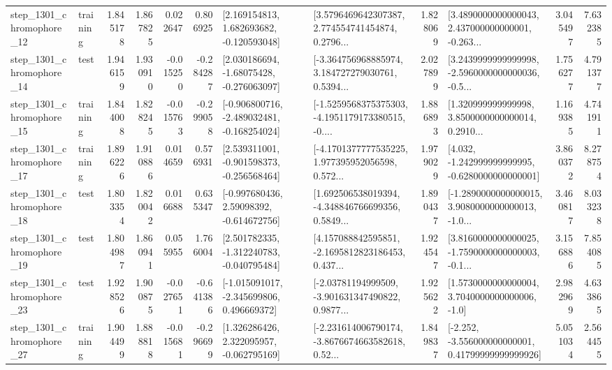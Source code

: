 \begin{tabular}{llrrrrllrlrr}
 step\_1301\_chromophore\_12 &  training &      1.845178 &    1.867825 &      0.022647 &  0.806925 &    [2.169154813, 1.682693682, -0.120593048] &  [3.5796469642307387, 2.774554741454874, 0.2796... &       1.828069 &  [3.4890000000000043, 2.437000000000001, -0.263... &            3.045497 &          7.632385 \\
 step\_1301\_chromophore\_14 &      test &      1.946159 &    1.930910 &     -0.015250 & -0.284287 &    [2.030186694, -1.68075428, -0.276063097] &  [-3.364756968885974, 3.184727279030761, 0.5394... &       2.027899 &  [3.2439999999999998, -2.5960000000000036, -0.5... &            1.756277 &          4.791377 \\
 step\_1301\_chromophore\_15 &  training &      1.844008 &    1.828245 &     -0.015763 & -0.299058 &  [-0.906800716, -2.489032481, -0.168254024] &  [-1.5259568375375303, -4.1951179173380515, -0.... &       1.886893 &  [1.320999999999998, 3.8500000000000014, 0.2910... &            1.169385 &          4.741911 \\
 step\_1301\_chromophore\_17 &  training &      1.896226 &    1.910886 &      0.014659 &  0.576931 &   [2.539311001, -0.901598373, -0.256568464] &  [-4.1701377777535225, 1.977395952056598, 0.572... &       1.979029 &   [4.032, -1.242999999999995, -0.6280000000000001] &            3.860372 &          8.278754 \\
 step\_1301\_chromophore\_18 &      test &      1.803354 &    1.820042 &      0.016688 &  0.635347 &    [-0.997680436, 2.59098392, -0.614672756] &  [1.692506538019394, -4.348846766699356, 0.5849... &       1.890437 &  [-1.2890000000000015, 3.9080000000000013, -1.0... &            3.460817 &          8.033238 \\
 step\_1301\_chromophore\_19 &      test &      1.804987 &    1.860941 &      0.055955 &  1.766004 &   [2.501782335, -1.312240783, -0.040795484] &  [4.157088842595851, -2.1695812823186453, 0.437... &       1.924547 &  [3.8160000000000025, -1.7590000000000003, -0.1... &            3.156886 &          7.854085 \\
 step\_1301\_chromophore\_23 &      test &      1.928526 &    1.900875 &     -0.027651 & -0.641386 &   [-1.015091017, -2.345699806, 0.496669372] &  [-2.03781194999509, -3.901631347490822, 0.9877... &       1.925622 &     [1.5730000000000004, 3.7040000000000006, -1.0] &            2.982969 &          4.633865 \\
 step\_1301\_chromophore\_27 &  training &      1.904499 &    1.888818 &     -0.015681 & -0.296699 &    [1.326286426, 2.322095957, -0.062795169] &  [-2.231614006790174, -3.8676674663582618, 0.52... &       1.849837 &  [-2.252, -3.556000000000001, 0.41799999999999926] &            5.051034 &          2.564455 \\

\end{tabular}
